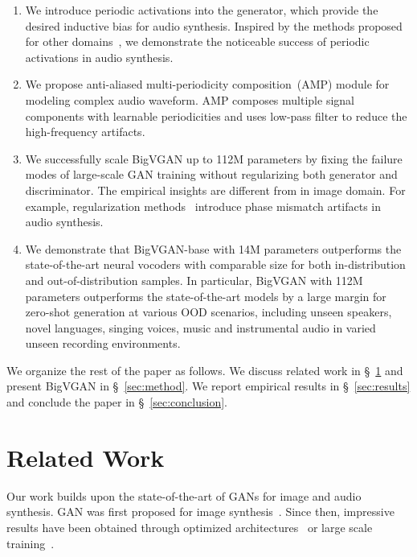 \documentclass{article} \usepackage{iclr2023_conference,times}
\theoremstyle{plain}
\theoremstyle{definition}
\theoremstyle{remark}
\begin{document}
\vspace{-0.1cm}
\begin{enumerate}[itemsep=-0.00pt, topsep=0pt, leftmargin=1.5em]
    \item We introduce periodic activations into the generator, which provide the desired inductive bias for audio synthesis. 
    Inspired by the methods proposed for other domains~\citep{liu2020neural, sitzmann2020implicit}, we demonstrate the noticeable success of periodic activations in audio synthesis.
    \vspace{-.03cm}
    \item We propose anti-aliased multi-periodicity composition~(AMP) module for modeling complex audio waveform. AMP composes multiple signal components with learnable periodicities and uses low-pass filter to reduce the high-frequency artifacts.
    \vspace{-.03cm}
    \item We successfully scale BigVGAN up to 112M parameters by fixing the failure modes of large-scale GAN training without regularizing both generator and discriminator. The empirical insights are different from \citet{brock2018large} in image domain. For example, regularization methods~\citep[e.g.,][]{miyato2018spectral} introduce phase mismatch artifacts in audio synthesis. 
    \vspace{-.03cm}
    \item We demonstrate that BigVGAN-base with 14M parameters outperforms the state-of-the-art neural vocoders with comparable size for both in-distribution and out-of-distribution samples.
    In particular, BigVGAN with 112M parameters outperforms the state-of-the-art models by a large margin for zero-shot generation at various OOD scenarios, including unseen speakers, novel languages,  singing voices, music and instrumental audio in varied unseen recording environments. \end{enumerate}
\vspace{-.3em}
We organize the rest of the paper as follows.
We discuss related work in \S~\ref{sec:related_work} and present BigVGAN in \S~\ref{sec:method}.
We report empirical results in \S~\ref{sec:results} and conclude the paper in \S~\ref{sec:conclusion}.



\vspace{-.2cm}
\section{Related Work}
\label{sec:related_work}
\vspace{-.2cm}
Our work builds upon the state-of-the-art of GANs for image and audio synthesis.  
GAN was first proposed for image synthesis~\citep{goodfellow2014generative}. Since then, impressive results have been obtained through optimized architectures~\citep[e.g.,][]{radford2015unsupervised, karras2021alias} or large scale training~\citep[e.g.,][]{brock2018large}.
\end{document}

